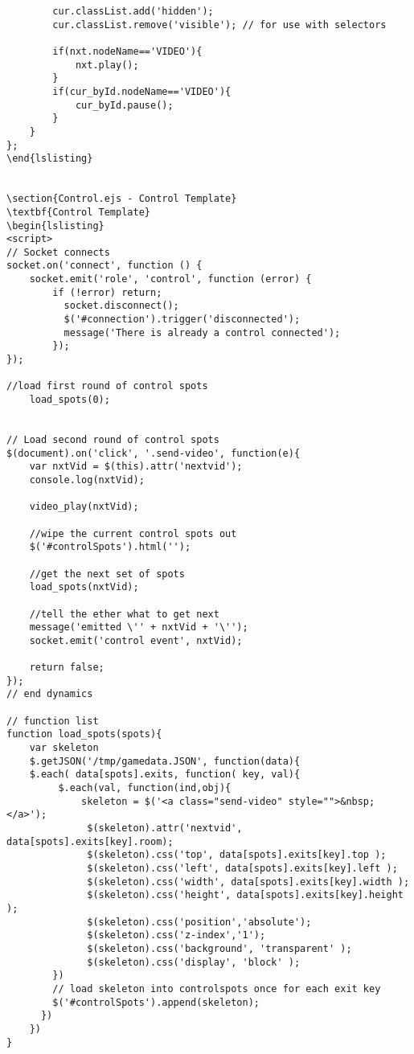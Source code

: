 \begin{lstlisting}
		cur.classList.add('hidden');
		cur.classList.remove('visible'); // for use with selectors

		if(nxt.nodeName=='VIDEO'){
			nxt.play();
		}
		if(cur_byId.nodeName=='VIDEO'){
			cur_byId.pause();
		}
	}
};
\end{lslisting}


\section{Control.ejs - Control Template}
\textbf{Control Template}
\begin{lslisting}
<script>
// Socket connects
socket.on('connect', function () {
	socket.emit('role', 'control', function (error) {
		if (!error) return;
		  socket.disconnect();
		  $('#connection').trigger('disconnected');
		  message('There is already a control connected');
		});
});

//load first round of control spots
	load_spots(0);


// Load second round of control spots
$(document).on('click', '.send-video', function(e){
	var nxtVid = $(this).attr('nextvid');
	console.log(nxtVid);
	
	video_play(nxtVid);

	//wipe the current control spots out
	$('#controlSpots').html('');
	
	//get the next set of spots
	load_spots(nxtVid);
	
	//tell the ether what to get next
	message('emitted \'' + nxtVid + '\'');
    socket.emit('control event', nxtVid);

	return false;
});   	
// end dynamics

// function list
function load_spots(spots){
	var skeleton
	$.getJSON('/tmp/gamedata.JSON', function(data){
  	$.each( data[spots].exits, function( key, val){
  		 $.each(val, function(ind,obj){
	  		 skeleton = $('<a class="send-video" style="">&nbsp;</a>');
	          $(skeleton).attr('nextvid', data[spots].exits[key].room);
	          $(skeleton).css('top', data[spots].exits[key].top );
	          $(skeleton).css('left', data[spots].exits[key].left );
	          $(skeleton).css('width', data[spots].exits[key].width );
	          $(skeleton).css('height', data[spots].exits[key].height );
	          $(skeleton).css('position','absolute');
	          $(skeleton).css('z-index','1');
	          $(skeleton).css('background', 'transparent' );
	          $(skeleton).css('display', 'block' );
  		})
  		// load skeleton into controlspots once for each exit key
  		$('#controlSpots').append(skeleton);		  
	  })
	})
}


\end{lstlisting}
